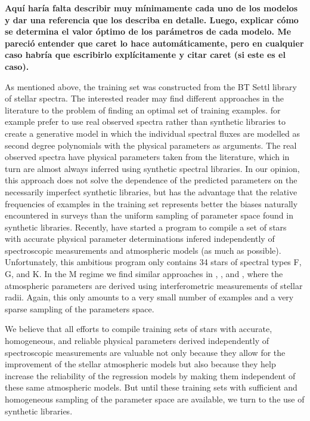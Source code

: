 {\bf Aquí haría falta describir muy mínimamente cada uno de los
modelos y dar una referencia que los describa en detalle. Luego,
explicar cómo se determina el valor óptimo de los parámetros de cada
modelo. Me pareció entender que caret lo hace automáticamente, pero en
cualquier caso habría que escribirlo explícitamente y citar caret (si
este es el caso).}

As mentioned above, the training set was constructed from the BT Settl
library of stellar spectra. The interested reader may find different
approaches in the literature to the problem of finding an optimal set
of training examples. \cite{hoggCannon} for example prefer to use real
observed spectra rather than synthetic libraries to create a
generative model in which the individual spectral fluxes are modelled
as second degree polynomials with the physical parameters as
arguments. The real observed spectra have physical parameters taken
from the literature, which in turn are almost always inferred using
synthetic spectral libraries. In our opinion, this approach does not
solve the dependence of the predicted parameters on the necessarily
imperfect synthetic libraries, but has the advantage that the relative
frequencies of examples in the training set represents better the
biases naturally encountered in surveys than the uniform sampling of
parameter space found in synthetic libraries. Recently, \cite{heiter}
have started a program to compile a set of stars with accurate
physical parameter determinations infered independently of
spectroscopic measurements and atmospheric models (as much as
possible). Unfortunately, this ambitious program only contains 34
stars of spectral types F, G, and K. In the M regime we find similar
approaches in \cite{dummy}, \cite{dummy}, and \cite{dummy}, where the
atmospheric parameters are derived using interferometric measurements
of stellar radii. Again, this only amounts to a very small number of
examples and a very sparse sampling of the parameters space.

We believe that all efforts to compile training sets of stars with
accurate, homogeneous, and reliable physical parameters derived
independently of spectroscopic measurements are valuable not only
because they allow for the improvement of the stellar atmospheric
models but also because they help increase the reliability of the
regression models by making them independent of these same atmospheric
models. But until these training sets with sufficient and homogeneous
sampling of the parameter space are available, we turn to the use of
synthetic libraries. 

